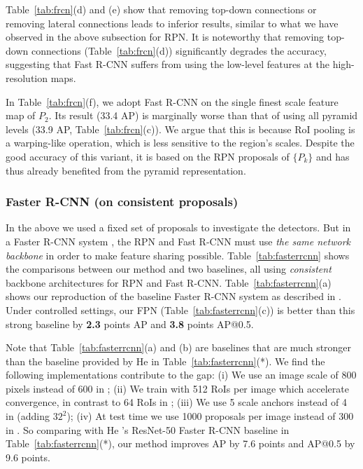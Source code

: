 \documentclass[10pt,twocolumn,letterpaper]{article}
\begin{document}
Table~\ref{tab:frcn}(d) and (e) show that removing top-down connections or removing lateral connections leads to inferior results, similar to what we have observed in the above subsection for RPN.
It is noteworthy that removing top-down connections (Table~\ref{tab:frcn}(d)) significantly degrades the accuracy, suggesting that Fast R-CNN suffers from using the low-level features at the high-resolution maps.

In Table~\ref{tab:frcn}(f), we adopt Fast R-CNN on the single finest scale feature map of $P_2$.
Its result (33.4 AP) is marginally worse than that of using all pyramid levels (33.9 AP, Table~\ref{tab:frcn}(c)).
We argue that this is because RoI pooling is a warping-like operation, which is less sensitive to the region's scales. 
Despite the good accuracy of this variant, it is based on the RPN proposals of $\{P_k\}$ and has thus already benefited from the pyramid representation.

\subsubsection{Faster R-CNN (on consistent proposals)}

In the above we used a fixed set of proposals to investigate the detectors. But in a Faster R-CNN system \cite{Ren2015a}, the RPN and Fast R-CNN must use \emph{the same network backbone} in order to make feature sharing possible.
Table~\ref{tab:fasterrcnn} shows the comparisons between our method and two baselines, all using \emph{consistent} backbone architectures for RPN and Fast R-CNN.
Table~\ref{tab:fasterrcnn}(a) shows our reproduction of the baseline Faster R-CNN system as described in \cite{He2016}.
Under controlled settings, our FPN (Table~\ref{tab:fasterrcnn}(c)) is better than this strong baseline by \textbf{2.3} points AP and \textbf{3.8} points AP@0.5.

Note that Table~\ref{tab:fasterrcnn}(a) and (b) are baselines that are much stronger than the baseline provided by He \etal \cite{He2016} in Table~\ref{tab:fasterrcnn}(*).
We find the following implementations contribute to the gap:
(i) We use an image scale of 800 pixels instead of 600 in \cite{Girshick2015a,He2016};
(ii) We train with 512 RoIs per image which accelerate convergence, in contrast to 64 RoIs in \cite{Girshick2015a,He2016};
(iii) We use 5 scale anchors instead of 4 in \cite{He2016} (adding $32^2$);
(iv) At test time we use 1000 proposals per image instead of 300 in \cite{He2016}.
So comparing with He \etal's ResNet-50 Faster R-CNN baseline in Table~\ref{tab:fasterrcnn}(*), our method improves AP by 7.6 points and AP@0.5 by 9.6 points.
\end{document}

